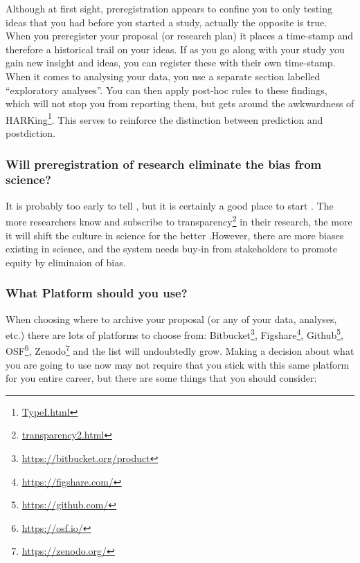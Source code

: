 \documentclass[
]{krantz}
\renewcommand{\href}[2]{#2\footnote{\url{#1}}}
\begin{document}
Although at first sight, preregistration appears to confine you to only testing ideas that you had before you started a study, actually the opposite is true. When you preregister your proposal (or research plan) it places a time-stamp and therefore a historical trail on your ideas. If as you go along with your study you gain new insight and ideas, you can register these with their own time-stamp. When it comes to analysing your data, you use a separate section labelled ``exploratory analyses''. You can then apply post-hoc rules to these findings, which will not stop you from reporting them, but gets around the awkwardness of \href{TypeI.html}{HARKing}. This serves to reinforce the distinction between prediction and postdiction.

\hypertarget{will-preregistration-of-research-eliminate-the-bias-from-science}{%
\subsubsection{Will preregistration of research eliminate the bias from science?}\label{will-preregistration-of-research-eliminate-the-bias-from-science}}

It is probably too early to tell \citep{rubin2020does}, but it is certainly a good place to start \citep{nosek2018preregistration}. The more researchers know and subscribe to \href{transparency2.html}{transparency} in their research, the more it will shift the culture in science for the better \citep{forstmeier2017detecting}.However, there are more biases existing in science, and the system needs buy-in from stakeholders to promote equity by eliminaion of bias.

\hypertarget{what-platform-should-you-use}{%
\subsubsection{What Platform should you use?}\label{what-platform-should-you-use}}

When choosing where to archive your proposal (or any of your data, analyses, etc.) there are lots of platforms to choose from: \href{https://bitbucket.org/product}{Bitbucket}, \href{https://figshare.com/}{Figshare}, \href{https://github.com/}{Github}, \href{https://osf.io/}{OSF}, \href{https://zenodo.org/}{Zenodo} and the list will undoubtedly grow. Making a decision about what you are going to use now may not require that you stick with this same platform for you entire career, but there are some things that you should consider:
\end{document}
